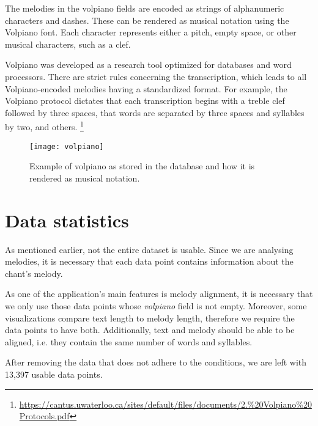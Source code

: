 The melodies in the volpiano fields are encoded as strings of alphanumeric characters and dashes. These can be rendered as musical notation using
the Volpiano font. Each character represents either a pitch, empty space, or other musical characters, such as a clef.

Volpiano was developed as a research tool optimized for databases and word processors. There are strict rules concerning the transcription, which leads
to all Volpiano-encoded melodies having a standardized format. For example, the Volpiano protocol dictates that each transcription begins with
a treble clef followed by three spaces, that words are separated by three spaces and syllables by two, and others.
\footnote{\url{https://cantus.uwaterloo.ca/sites/default/files/documents/2.\%20Volpiano\%20Protocols.pdf}}

\begin{figure}[h!]
\centering
\texttt{[image: volpiano]}
\caption{Example of volpiano as stored in the database and how it is rendered as musical notation. \cite[Figure~2]{cantus_lacoste}}
\end{figure}

\section{Data statistics}

As mentioned earlier, not the entire dataset is usable. Since we are analysing melodies, it is necessary that each data point contains information
about the chant's melody.

As one of the application's main features is melody alignment, it is necessary that we only use those data points whose \emph{volpiano} field is
not empty. Moreover, some visualizations compare text length to melody length, therefore we require the data points to have both. Additionally, 
text and melody should be able to be aligned, i.e. they contain the same number of words and syllables.

After removing the data that does not adhere to the conditions, we are left with 13,397 usable data points.

